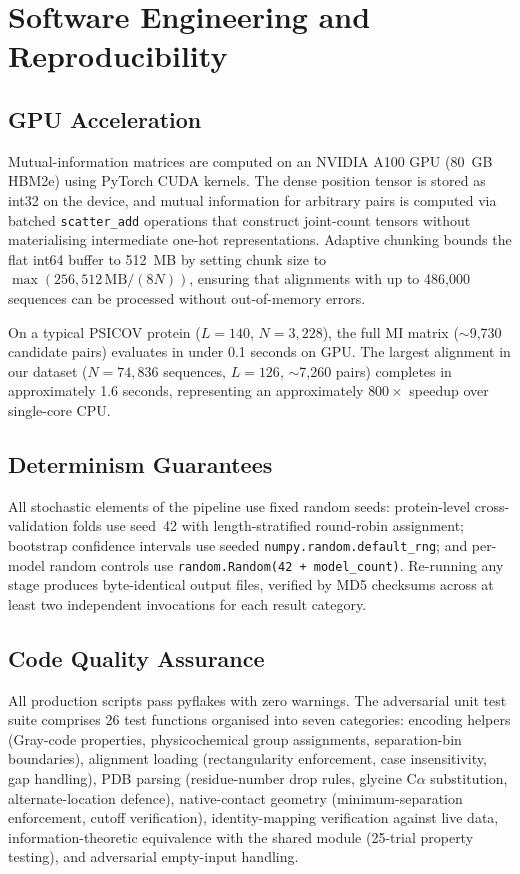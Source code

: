 \section{Software Engineering and Reproducibility}
\label{sec:methods-software}

\subsection{GPU Acceleration}
Mutual-information matrices are computed on an NVIDIA A100 GPU (80~GB HBM2e)
using PyTorch CUDA kernels.  The dense position tensor is stored as
int32 on the device, and mutual information for arbitrary pairs is computed
via batched \texttt{scatter\_add} operations that construct joint-count
tensors without materialising intermediate one-hot representations.  Adaptive
chunking bounds the flat int64 buffer to 512~MB by setting chunk size to
$\max(256, 512\,\text{MB} / (8N))$, ensuring that alignments with up to
486{,}000 sequences can be processed without out-of-memory errors.

On a typical PSICOV protein ($L = 140$, $N = 3{,}228$), the full MI matrix
($\sim$9{,}730 candidate pairs) evaluates in under 0.1 seconds on GPU.
The largest alignment in our dataset ($N = 74{,}836$ sequences,
$L = 126$, $\sim$7{,}260 pairs) completes in approximately 1.6 seconds,
representing an approximately $800\times$ speedup over single-core CPU.

\subsection{Determinism Guarantees}
All stochastic elements of the pipeline use fixed random seeds: protein-level
cross-validation folds use seed~42 with length-stratified round-robin
assignment; bootstrap confidence intervals use seeded \texttt{numpy.random.default\_rng};
and per-model random controls use \texttt{random.Random(42 + model\_count)}.
Re-running any stage produces byte-identical output files, verified by MD5
checksums across at least two independent invocations for each result category.

\subsection{Code Quality Assurance}
All production scripts pass pyflakes with zero warnings.  The adversarial unit
test suite comprises 26 test functions organised into seven categories:
encoding helpers (Gray-code properties, physicochemical group assignments,
separation-bin boundaries), alignment loading (rectangularity enforcement,
case insensitivity, gap handling), PDB parsing (residue-number drop rules,
glycine C$\alpha$ substitution, alternate-location defence), native-contact
geometry (minimum-separation enforcement, cutoff verification), identity-mapping
verification against live data, information-theoretic equivalence with the
shared module (25-trial property testing), and adversarial empty-input handling.


